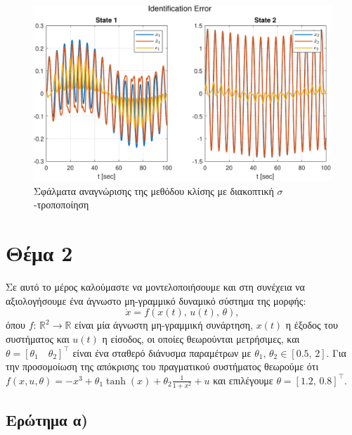 \documentclass[a4paper,12pt]{article}
\begin{document}
\begin{figure}
    \centering
    \includegraphics[width=1\linewidth]{plot/task1_gradient_identification_error.pdf}
    \caption{Σφάλματα αναγνώρισης της μεθόδου κλίσης με διακοπτική $\sigma$-τροποποίηση}
    \label{fig:task1_gradient_identification_error}
\end{figure}

\newpage

\section*{Θέμα 2}
Σε αυτό το μέρος καλούμαστε να μοντελοποιήσουμε και στη συνέχεια να αξιολογήσουμε ένα άγνωστο μη-γραμμικό 
δυναμικό σύστημα της μορφής:
\[
    \dot{x} = f(x(t), \, u(t), \, \theta),
\]
όπου $f:\, \mathbb{R}^2 \to \mathbb{R}$ είναι μία άγνωστη μη-γραμμική συνάρτηση, $x(t)$ η έξοδος του 
συστήματος και $u(t)$ η είσοδος, οι οποίες θεωρούνται μετρήσιμες, και 
$\theta = [\theta_1 \quad \theta_2]^{\top}$ είναι ένα σταθερό διάνυσμα παραμέτρων με 
$\theta_1, \, \theta_2 \in [0.5, \, 2]$. Για την προσομοίωση της απόκρισης του πραγματικού συστήματος
θεωρούμε ότι $f(x, u, \theta) = -x^3 + \theta_1 \tanh(x) + \theta_2 \frac{1}{1 + x^2} + u$
και επιλέγουμε $\theta = [1.2, \, 0.8]^{\top}$.

\subsection*{Ερώτημα α)}
\end{document}
